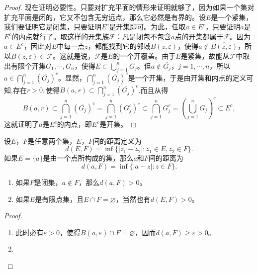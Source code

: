 \documentclass[../../main.tex]{subfiles}
\begin{document}
\begin{proof}
现在证明必要性。只要对扩充平面的情形来证明就够了，因为如果一个集对扩充平面是闭的，它又不包含无穷远点，那么它必然是有界的。设\(E\)是一个紧集，我们要证明它是闭集，只要证明\(E^c\)是开集即可。为此，任取\(a \in E^c\)，只要证明\(a\)是\(E^c\)的内点就行了。取这样的开集族\(\mathscr{F}\)：凡是闭包不包含\(a\)点的开集都属于\(\mathscr{F}\)。因为\(a \in E^c\)，因此对\(E\)中每一点\(z\)，都能找到它的邻域\(B(z, \varepsilon)\)，使得\(a \notin \overline{B(z, \varepsilon)}\)，所以\(B(z, \varepsilon) \in \mathscr{F}\)。这就是说，\(\mathscr{F}\)是\(E\)的一个开覆盖。由于\(E\)是紧集，故能从\(\mathscr{F}\)中取出有限个开集\(G_1, \cdots, G_n\)，使得\(E \subset \bigcup_{j = 1}^n G_j\)。但\(a \notin \overline{G_j}\)，\(j = 1, \cdots, n\)，所以\(a \in \bigcap_{j = 1}^n (\overline{G_j})^c\)。显然，\(\bigcap_{j = 1}^n (\overline{G_j})^c\)是一个开集，于是由开集和内点的定义可知,存在$r>0,$使得$B(a,r)\subset \bigcap_{j = 1}^n (\overline{G_j})^c$.而且从得
\[
B(a,r)\subset \bigcap_{j = 1}^n (\overline{G_j})^c = \bigcap_{j = 1}^n (G_j^c)^\circ \subset \bigcap_{j = 1}^n G_j^c = \left( \bigcup_{j = 1}^n G_j \right)^c \subset E^c,
\]
这就证明了\(a\)是\(E^c\)的内点，即\(E^c\)是开集。
\end{proof}

\begin{definition}
设\(E\)，\(F\)是任意两个集，\(E\)，\(F\)间的距离定义为
\[
d(E, F) = \inf\{ | z_1 - z_2 | : z_1 \in E, z_2 \in F \}.
\]
如果\(E = \{ a \}\)是由一个点所构成的集，那么\(a\)和\(F\)间的距离为
\[
d(a, F) = \inf\{ | a - z | : z \in F \}.
\]
\end{definition}

\begin{proposition}
\begin{enumerate}[(1)]
\item 如果\(F\)是闭集，\(a \notin F\)，那么\(d(a, F) > 0\)。

\item 如果\(E\)是有限点集，且\(E \cap F = \varnothing\)，当然也有\(d(E, F) > 0\)。
\end{enumerate}
\end{proposition}
\begin{proof}
\begin{enumerate}[(1)]
\item 此时必有\(\varepsilon > 0\)，使得\(B(a, \varepsilon) \cap F = \varnothing\)，因而\(d(a, F) \geqslant \varepsilon > 0\)。

\item 
\end{enumerate}
\end{proof}
\end{document}
